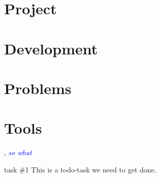\documentclass[BSP,english,oneside]{classes/gucthesis}
\newcommand{\comment}[1]{\textcolor{blue}{\emph{#1}}}
\newcommand{\todo}[1]{{\color{green}#1}}
\begin{document}


\makefrontpages



\tableofcontents
\listoffigures
\listoftables



\chapter{Project}




\chapter{Development}



\chapter{Problems}



\chapter{Tools}







\appendix %
\appendixpage
\addappheadtotoc







\GUC, 
\comment{so what}

\todo{task \#1}
This is a todo-task we need to get done.
\end{document}
